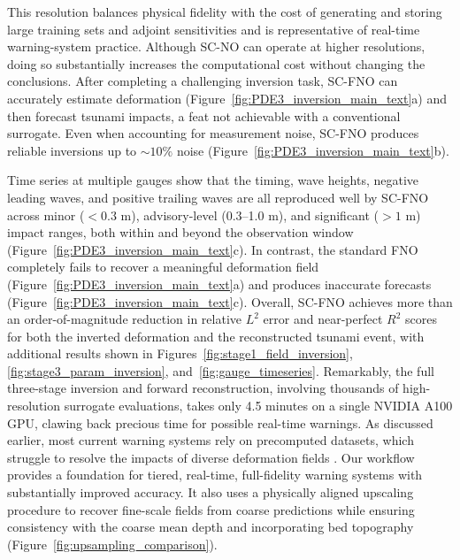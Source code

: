 This resolution balances physical fidelity with the cost of generating and storing large training sets and adjoint sensitivities and is representative of real-time warning-system practice. Although SC-NO can operate at higher resolutions, doing so substantially increases the computational cost without changing the conclusions. After completing a challenging inversion task, SC-FNO can accurately estimate deformation (Figure~\ref{fig:PDE3_inversion_main_text}a) and then forecast tsunami impacts, a feat not achievable with a conventional surrogate. Even when accounting for measurement noise, SC-FNO produces reliable inversions up to $\sim10\%$ noise (Figure~\ref{fig:PDE3_inversion_main_text}b). 

Time series at multiple gauges show that the timing, wave heights, negative leading waves, and positive trailing waves are all reproduced well by SC-FNO across minor ($<0.3$ m), advisory-level (0.3--1.0 m), and significant ($>1$ m) impact ranges, both within and beyond the observation window (Figure~\ref{fig:PDE3_inversion_main_text}c). In contrast, the standard FNO completely fails to recover a meaningful deformation field (Figure~\ref{fig:PDE3_inversion_main_text}a) and produces inaccurate forecasts (Figure~\ref{fig:PDE3_inversion_main_text}c). Overall, SC-FNO achieves more than an order-of-magnitude reduction in relative $L^2$ error and near-perfect $R^2$ scores for both the inverted deformation and the reconstructed tsunami event, with additional results shown in Figures~\ref{fig:stage1_field_inversion}, \ref{fig:stage3_param_inversion}, and~\ref{fig:gauge_timeseries}. Remarkably, the full three-stage inversion and forward reconstruction, involving thousands of high-resolution surrogate evaluations, takes only 4.5 minutes on a single NVIDIA A100 GPU, clawing back precious time for possible real-time warnings. As discussed earlier, most current warning systems rely on precomputed datasets, which struggle to resolve the impacts of diverse deformation fields \citep{titov2005real, ishiwatari2012tsunami}. Our workflow provides a foundation for tiered, real-time, full-fidelity warning systems with substantially improved accuracy. It also uses a physically aligned upscaling procedure to recover fine-scale fields from coarse predictions while ensuring consistency with the coarse mean depth and incorporating bed topography (Figure~\ref{fig:upsampling_comparison}).

